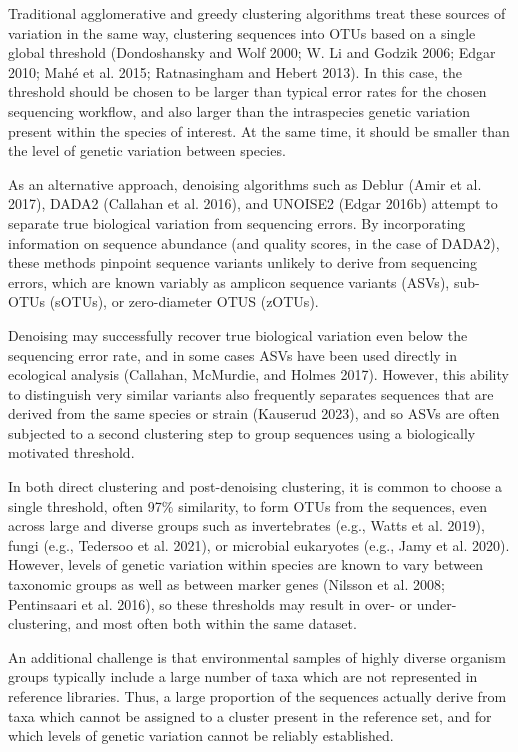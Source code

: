 \documentclass[
]{article}
\begin{document}
Traditional agglomerative and greedy clustering algorithms treat these sources of variation in the same way, clustering sequences into OTUs based on a single global threshold (Dondoshansky and Wolf 2000; W. Li and Godzik 2006; Edgar 2010; Mahé et al. 2015; Ratnasingham and Hebert 2013).
In this case, the threshold should be chosen to be larger than typical error rates for the chosen sequencing workflow, and also larger than the intraspecies genetic variation present within the species of interest.
At the same time, it should be smaller than the level of genetic variation between species.

As an alternative approach, denoising algorithms such as Deblur (Amir et al. 2017), DADA2 (Callahan et al. 2016), and UNOISE2 (Edgar 2016b) attempt to separate true biological variation from sequencing errors.
By incorporating information on sequence abundance (and quality scores, in the case of DADA2), these methods pinpoint sequence variants unlikely to derive from sequencing errors, which are known variably as amplicon sequence variants (ASVs), sub-OTUs (sOTUs), or zero-diameter OTUS (zOTUs).

Denoising may successfully recover true biological variation even below the sequencing error rate, and in some cases ASVs have been used directly in ecological analysis (Callahan, McMurdie, and Holmes 2017).
However, this ability to distinguish very similar variants also frequently separates sequences that are derived from the same species or strain (Kauserud 2023), and so ASVs are often subjected to a second clustering step to group sequences using a biologically motivated threshold.

In both direct clustering and post-denoising clustering, it is common to choose a single threshold, often 97\% similarity, to form OTUs from the sequences, even across large and diverse groups such as invertebrates (e.g., Watts et al. 2019), fungi (e.g., Tedersoo et al. 2021), or microbial eukaryotes (e.g., Jamy et al. 2020).
However, levels of genetic variation within species are known to vary between taxonomic groups as well as between marker genes (Nilsson et al. 2008; Pentinsaari et al. 2016), so these thresholds may result in over- or under-clustering, and most often both within the same dataset.

An additional challenge is that environmental samples of highly diverse organism groups typically include a large number of taxa which are not represented in reference libraries.
Thus, a large proportion of the sequences actually derive from taxa which cannot be assigned to a cluster present in the reference set, and for which levels of genetic variation cannot be reliably established.
\end{document}
